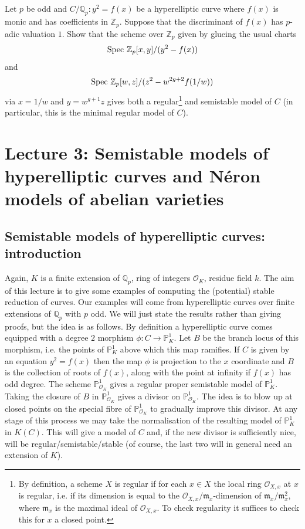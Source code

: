 \documentclass[12pt]{amsart}
\numberwithin{equation}{section}
\theoremstyle{remark}
\theoremstyle{definition}
\theoremstyle{definition}
\theoremstyle{definition}
\theoremstyle{definition}
\theoremstyle{definition}
\theoremstyle{definition}
\begin{document}
\subsection{}
Let $p$ be odd and $C/\mathbb{Q}_p:y^2=f(x)$ be a hyperelliptic curve where $f(x)$ is monic and has coefficients in $\mathbb{Z}_p$. Suppose that the discriminant of $f(x)$ has $p$-adic valuation $1$. Show that the scheme over $\mathbb{Z}_p$ given by glueing the usual charts
\[\textup{Spec }\mathbb{Z}_p[x,y]/(y^2-f(x))\]
and
\[\textup{Spec }\mathbb{Z}_p[w,z]/(z^2-w^{2g+2}f(1/w))\] 
via $x=1/w$ and $y=w^{g+1}z$ gives both a regular\footnote{By definition, a scheme $X$ is regular if for each $x\in X$ the  local ring $\mathcal{O}_{X,x}$ at $x$ is regular, i.e. if its dimension is equal to the $\mathcal{O}_{X,x}/\mathfrak{m}_x$-dimension of $\mathfrak{m}_x/\mathfrak{m}_{x}^2$, where $\mathfrak{m}_x$ is the maximal ideal of $\mathcal{O}_{X,x}$. To check regularity it suffices to check this for $x$ a closed point.} and semistable model of $C$ (in particular, this is the minimal regular model of $C$).

\newpage

\section{Lecture 3: Semistable models of hyperelliptic curves and N\'{e}ron models of abelian varieties}

\subsection{Semistable models of hyperelliptic curves: introduction}

Again, $K$ is a finite extension of $\mathbb{Q}_p$, ring of integers $\mathcal{O}_K$, residue field $k$. The aim of this lecture is to give some examples of computing the (potential) stable reduction of curves. Our examples will come from hyperelliptic curves over finite extensions of $\mathbb{Q}_p$ with $p$ odd. We will just state the results rather than giving proofs, but the idea is as follows. By definition a hyperelliptic curve comes equipped with a degree $2$ morphism $\phi:C\rightarrow \mathbb{P}^1_K$. Let $B$ be the branch locus of this morphism, i.e. the points of $\mathbb{P}^1_K$ above which this map ramifies. If $C$ is given by an equation $y^2=f(x)$ then the map $\phi$ is projection to the $x$ coordinate and $B$ is the collection of roots of $f(x)$, along with the point at infinity if $f(x)$ has odd degree. The scheme $\mathbb{P}^1_{\mathcal{O}_K}$ gives a regular proper semistable model of $\mathbb{P}^1_K$. Taking the closure of $B$ in $\mathbb{P}^1_{\mathcal{O}_K}$ gives a divisor on $\mathbb{P}^1_{\mathcal{O}_K}$. The idea is to blow up at closed points on the special fibre of $\mathbb{P}^1_{\mathcal{O}_K}$ to gradually improve this divisor. At any stage of this process we may take the normalisation of the resulting  model of $\mathbb{P}^1_K$ in $K(C)$. This will give a model of $C$ and, if the new divisor is sufficiently nice, will be regular/semistable/stable (of course, the last two will in general need an extension of $K$).
\end{document}
